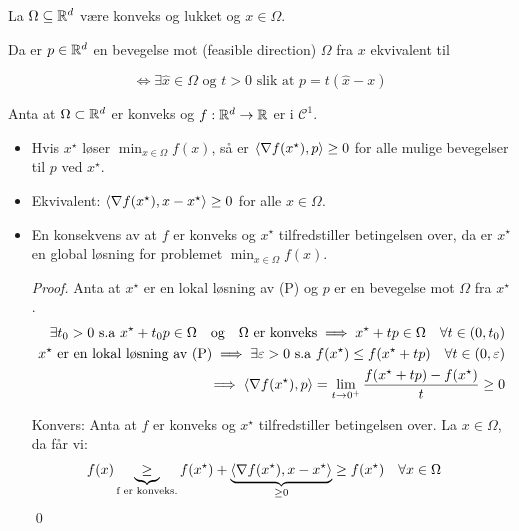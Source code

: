 \begin{lemma}{}{}
  La \(\Omega \subseteq \mathbb{R}^d\) være konveks og lukket og \(x \in \Omega\).

  Da er \(p \in \mathbb{R}^d\) en bevegelse mot (feasible direction) \(\Omega\) fra \(x\) ekvivalent til

  \[
    \Leftrightarrow \exists \hat{x} \in \Omega \text{ og } t > 0 \text{ slik at } p = t(\hat{x} - x)
  \]

\end{lemma}

\begin{proposition}{}{}
  Anta at \(\Omega \subset \mathbb{R}^d\) er konveks og \(f: \mathbb{R}^d \to \mathbb{R}\) er i \(\mathcal{C}^1\).
  \begin{itemize}
    \item Hvis \(x^\star\) løser \(\min_{x \in \Omega} f(x)\), så er \(\langle\nabla f(x^\star), p\rangle \geq 0\) for alle mulige bevegelser til \(p\) ved \(x^\star\).
    \item Ekvivalent: \(\langle\nabla f(x^\star), x - x^\star\rangle \geq 0\) for alle \(x \in \Omega\).
    \item En konsekvens av at \(f\) er konveks og \(x^\star\) tilfredstiller betingelsen over, da er \(x^\star\) en global løsning for problemet \(\min_{x \in \Omega} f(x)\).
          \begin{proof}{}{}
            Anta at \(x^\star\) er en lokal løsning av (P) og \(p\) er en bevegelse mot \(\Omega\) fra \(x^\star\).
            \begin{align*}
              \exists t_0 > 0 \text{ s.a } x^\star + t_0 p \in \Omega \quad \text{og} \quad \Omega \text{ er konveks} \implies x^\star + t p \in \Omega \quad \forall t \in (0, t_0) \\
              x^\star \text{ er en lokal løsning av (P)} \implies \exists \varepsilon > 0 \text{ s.a } f(x^\star) \leq f(x^\star + t p) \quad \forall t \in (0, \varepsilon)         \\
              \implies \langle\nabla f(x^\star), p\rangle = \lim_{t \to 0^+} \frac{f(x^\star + t p) - f(x^\star)}{t} \geq 0                                                                \\
            \end{align*}

            Konvers: Anta at \(f\) er konveks og \(x^\star\) tilfredstiller betingelsen over. La \(x \in \Omega\), da får vi:
            \begin{align*}
              f(x) & \underbrace{\geq}_{\text{f er konveks.}} f(x^\star) + \underbrace{\langle\nabla f(x^\star), x - x^\star\rangle}_{\geq 0} \geq f(x^\star) \quad \forall x \in \Omega
            \end{align*}
            \qed
          \end{proof}
  \end{itemize}
\end{proposition}


